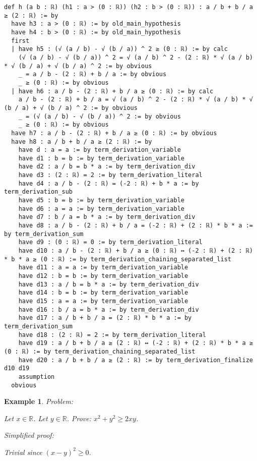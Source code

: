 \documentclass{article}
\newtheorem{example}{Example}
\begin{document}
\begin{tcolorbox}[colback=white!10, width=\linewidth]
\begin{lstlisting}[language=Lean4]
def h (a b : ℝ) (h1 : a > (0 : ℝ)) (h2 : b > (0 : ℝ)) : a / b + b / a ≥ (2 : ℝ) := by
  have h3 : a > (0 : ℝ) := by old_main_hypothesis
  have h4 : b > (0 : ℝ) := by old_main_hypothesis
  first
  | have h5 : (√ (a / b) - √ (b / a)) ^ 2 ≥ (0 : ℝ) := by calc
    (√ (a / b) - √ (b / a)) ^ 2 = √ (a / b) ^ 2 - (2 : ℝ) * √ (a / b) * √ (b / a) + √ (b / a) ^ 2 := by obvious
    _ = a / b - (2 : ℝ) + b / a := by obvious
    _ ≥ (0 : ℝ) := by obvious
  | have h6 : a / b - (2 : ℝ) + b / a ≥ (0 : ℝ) := by calc
    a / b - (2 : ℝ) + b / a = √ (a / b) ^ 2 - (2 : ℝ) * √ (a / b) * √ (b / a) + √ (b / a) ^ 2 := by obvious
    _ = (√ (a / b) - √ (b / a)) ^ 2 := by obvious
    _ ≥ (0 : ℝ) := by obvious
  have h7 : a / b - (2 : ℝ) + b / a ≥ (0 : ℝ) := by obvious
  have h8 : a / b + b / a ≥ (2 : ℝ) := by
    have d : a = a := by term_derivation_variable
    have d1 : b = b := by term_derivation_variable
    have d2 : a / b = b * a := by term_derivation_div
    have d3 : (2 : ℝ) = 2 := by term_derivation_literal
    have d4 : a / b - (2 : ℝ) = (-2 : ℝ) + b * a := by term_derivation_sub
    have d5 : b = b := by term_derivation_variable
    have d6 : a = a := by term_derivation_variable
    have d7 : b / a = b * a := by term_derivation_div
    have d8 : a / b - (2 : ℝ) + b / a = (-2 : ℝ) + (2 : ℝ) * b * a := by term_derivation_sum
    have d9 : (0 : ℝ) = 0 := by term_derivation_literal
    have d10 : a / b - (2 : ℝ) + b / a ≥ (0 : ℝ) ↔ (-2 : ℝ) + (2 : ℝ) * b * a ≥ (0 : ℝ) := by term_derivation_chaining_separated_list
    have d11 : a = a := by term_derivation_variable
    have d12 : b = b := by term_derivation_variable
    have d13 : a / b = b * a := by term_derivation_div
    have d14 : b = b := by term_derivation_variable
    have d15 : a = a := by term_derivation_variable
    have d16 : b / a = b * a := by term_derivation_div
    have d17 : a / b + b / a = (2 : ℝ) * b * a := by term_derivation_sum
    have d18 : (2 : ℝ) = 2 := by term_derivation_literal
    have d19 : a / b + b / a ≥ (2 : ℝ) ↔ (-2 : ℝ) + (2 : ℝ) * b * a ≥ (0 : ℝ) := by term_derivation_chaining_separated_list
    have d20 : a / b + b / a ≥ (2 : ℝ) := by term_derivation_finalize d10 d19
    assumption
  obvious

\end{lstlisting}
\end{tcolorbox}


\begin{example}
Problem:
\begin{tcolorbox}[colback=yellow!10, width=\linewidth]
Let $x\in\mathbb{R}$. Let $y\in\mathbb{R}$.
    Prove: $x^2 + y^2 \ge 2xy$.
\end{tcolorbox}

Simplified proof:
\begin{tcolorbox}[colback=blue!10, width=\linewidth]
Trivial since $(x-y)^2 \ge 0$.
\end{tcolorbox}
\end{example}
\end{document}
